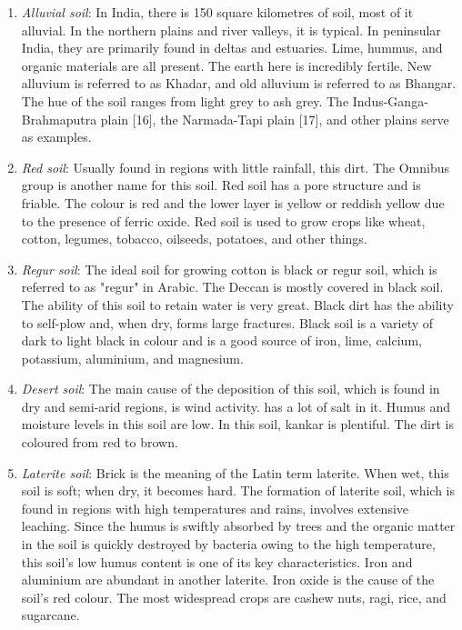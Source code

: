 \documentclass[conference]{IEEEtran}
\begin{document}
\begin{enumerate}
\item \textit{Alluvial soil}: In India, there is 150 square kilometres of soil, most of it alluvial. In the northern plains and river valleys, it is typical. In peninsular India, they are primarily found in deltas and estuaries. Lime, hummus, and organic materials are all present. The earth here is incredibly fertile. New alluvium is referred to as Khadar, and old alluvium is referred to as Bhangar. The hue of the soil ranges from light grey to ash grey. The Indus-Ganga-Brahmaputra plain [16], the Narmada-Tapi plain [17], and other plains serve as examples.
\item \textit{Red soil}: Usually found in regions with little rainfall, this dirt. The Omnibus group is another name for this soil. Red soil has a pore structure and is friable. The colour is red and the lower layer is yellow or reddish yellow due to the presence of ferric oxide. Red soil is used to grow crops like wheat, cotton, legumes, tobacco, oilseeds, potatoes, and other things.
\item \textit{Regur soil}: The ideal soil for growing cotton is black or regur soil, which is referred to as "regur" in Arabic. The Deccan is mostly covered in black soil. The ability of this soil to retain water is very great. Black dirt has the ability to self-plow and, when dry, forms large fractures. Black soil is a variety of dark to light black in colour and is a good source of iron, lime, calcium, potassium, aluminium, and magnesium.
\item \textit{Desert soil}: The main cause of the deposition of this soil, which is found in dry and semi-arid regions, is wind activity. has a lot of salt in it. Humus and moisture levels in this soil are low. In this soil, kankar is plentiful. The dirt is coloured from red to brown.
\item \textit{Laterite soil}: Brick is the meaning of the Latin term laterite. When wet, this soil is soft; when dry, it becomes hard. The formation of laterite soil, which is found in regions with high temperatures and rains, involves extensive leaching. Since the humus is swiftly absorbed by trees and the organic matter in the soil is quickly destroyed by bacteria owing to the high temperature, this soil's low humus content is one of its key characteristics. Iron and aluminium are abundant in another laterite. Iron oxide is the cause of the soil's red colour. The most widespread crops are cashew nuts, ragi, rice, and sugarcane.

\end{enumerate}
\end{document}
